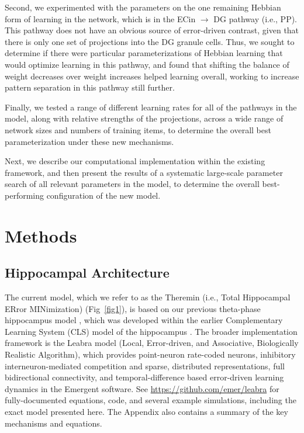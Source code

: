 \documentclass[10pt,letterpaper]{article}
\begin{document}
Second, we experimented with the parameters on the one remaining Hebbian form of learning in the network, which is in the ECin $\rightarrow$ DG pathway (i.e., PP).  This pathway does not have an obvious source of error-driven contrast, given that there is only one set of projections into the DG granule cells.  Thus, we sought to determine if there were particular parameterizations of Hebbian learning that would optimize learning in this pathway, and found that shifting the balance of weight decreases over weight increases helped learning overall, working to increase pattern separation in this pathway still further.

Finally, we tested a range of different learning rates for all of the pathways in the model, along with relative strengths of the projections, across a wide range of network sizes and numbers of training items, to determine the overall best parameterization under these new mechanisms.

Next, we describe our computational implementation within the existing \cite{KetzMorkondaOReilly13} framework, and then present the results of a systematic large-scale parameter search of all relevant parameters in the model, to determine the overall best-performing configuration of the new model. 


\section*{Methods}

\subsection*{Hippocampal Architecture}

The current model, which we refer to as the Theremin (i.e., Total Hippocampal ERror MINimization) (Fig~\ref{fig1}), is based on our previous theta-phase hippocampus model \cite{KetzMorkondaOReilly13}, which was developed within the earlier Complementary Learning System (CLS) model of the hippocampus \cite{NormanOReilly03,OReillyRudy01}.  The broader implementation framework is the Leabra model (Local, Error-driven, and Associative, Biologically Realistic Algorithm), which provides point-neuron rate-coded neurons, inhibitory interneuron-mediated competition and sparse, distributed representations, full bidirectional connectivity, and temporal-difference based error-driven learning dynamics \cite{OReillyMunakata00,OReillyMunakataFrankEtAl12} in the Emergent software.  See \url{https://github.com/emer/leabra} for fully-documented equations, code, and several example simulations, including the exact model presented here.  The Appendix also contains a summary of the key mechanisms and equations.
\end{document}
